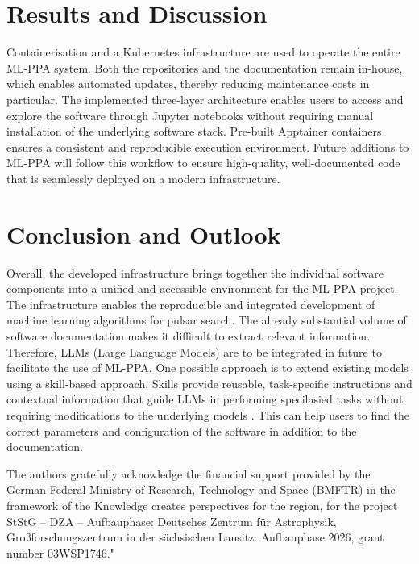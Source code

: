 \documentclass[11pt,twoside]{article}
\begin{document}
\section{Results and Discussion}
Containerisation and a Kubernetes infrastructure are used to operate the entire ML-PPA system. Both the repositories and the documentation remain in-house, which enables automated updates, thereby reducing maintenance costs in particular. 
The implemented three-layer architecture enables users to access and explore the software through Jupyter notebooks without requiring manual installation of the underlying software stack. Pre-built Apptainer containers ensures a consistent and reproducible execution environment.
Future additions to ML-PPA will follow this workflow to ensure high-quality, well-documented code that is seamlessly deployed on a modern infrastructure.



\section{Conclusion and Outlook}

Overall, the developed infrastructure brings together the individual software components into a unified and accessible environment for the ML-PPA project. The infrastructure enables the reproducible and integrated development of machine learning algorithms for pulsar search.
The already substantial volume of software documentation makes it difficult to extract relevant information. Therefore, LLMs (Large Language Models) are to be integrated in future to facilitate the use of ML-PPA. One possible approach is to extend existing models using a skill-based approach. Skills provide reusable, task-specific instructions and contextual information that guide LLMs in performing specilasied tasks without requiring modifications to the underlying models \citet{agent_skills_specification}. This can help users to find the correct parameters and configuration of the software in addition to the documentation.

\acknowledgements 
The authors gratefully acknowledge the financial support provided by the German Federal Ministry of Research, Technology and Space (BMFTR) in the framework of the Knowledge creates perspectives for the region, for the project StStG -- DZA -- Aufbauphase: Deutsches Zentrum f\"{u}r Astrophysik, Gro\ss{}forschungszentrum in der s\"{a}chsischen Lausitz: Aufbauphase 2026, grant number 03WSP1746."



\end{document}
